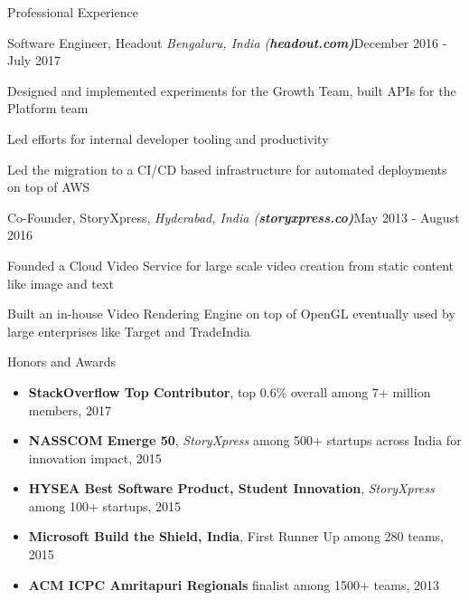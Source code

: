 \documentclass{resume}
\begin{document}
\begin{rSection}{Professional Experience}

\begin{rSubsection}{Software Engineer, Headout \it{Bengaluru, India} (\bf{headout.com})}{December 2016 - July 2017}{}{}
\item Designed and implemented experiments for the Growth Team, built APIs for the Platform team
\item Led efforts for internal developer tooling and productivity
\item Led the migration to a CI/CD based infrastructure for automated deployments on top of AWS

\end{rSubsection}

\begin{rSubsection}{Co-Founder, StoryXpress, \it{Hyderabad, India} (\bf{storyxpress.co})}{May 2013 - August 2016}{}{}
\item Founded a Cloud Video Service for large scale video creation from static content like image and text
\item Built an in-house Video Rendering Engine on top of OpenGL eventually used by large enterprises like Target and TradeIndia

\end{rSubsection}

\end{rSection}

\begin{rSection}{Honors and Awards}
  \begin{itemize}[label={},topsep=0pt,itemsep=-0.5ex,partopsep=1ex,parsep=1ex,leftmargin=0.25em]
    \item  {\bf StackOverflow Top Contributor}, top 0.6\% overall among 7+ million members, 2017
  \item {\bf NASSCOM Emerge 50}, {\it StoryXpress} among 500+ startups across India for innovation impact, 2015
  \item {\bf HYSEA Best Software Product, Student Innovation}, {\it StoryXpress} among 100+ startups, 2015
  \item {\bf Microsoft Build the Shield, India}, First Runner Up among 280 teams, 2015
  \item {\bf ACM ICPC Amritapuri Regionals} finalist among 1500+ teams, 2013
  \end{itemize}
\end{rSection}
\end{document}
